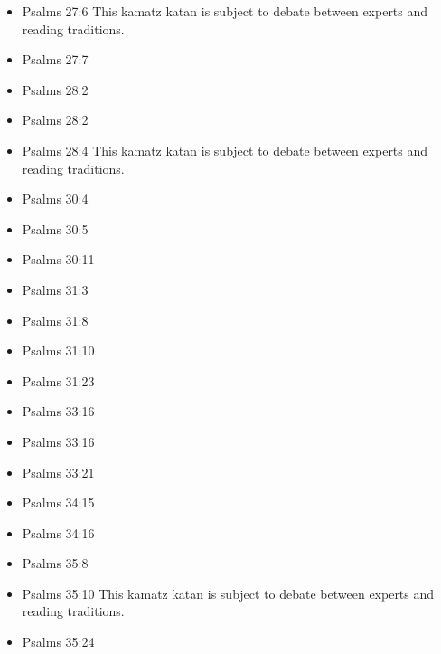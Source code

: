\documentclass[14pt]{book}
\begin{document}
\begin{multicols}{2}
\begin{itemize}
\item Psalms 27:6 This kamatz katan is subject to debate between experts and reading traditions.

\item Psalms 27:7

\item Psalms 28:2

\item Psalms 28:2

\item Psalms 28:4 This kamatz katan is subject to debate between experts and reading traditions.

\item Psalms 30:4

\item Psalms 30:5

\item Psalms 30:11

\item Psalms 31:3

\item Psalms 31:8

\item Psalms 31:10

\item Psalms 31:23


\item Psalms 33:16

\item Psalms 33:16

\item Psalms 33:21

\item Psalms 34:15

\item Psalms 34:16


\item Psalms 35:8

\item Psalms 35:10 This kamatz katan is subject to debate between experts and reading traditions.

\item Psalms 35:24


\end{itemize}
\end{multicols}
\end{document}
